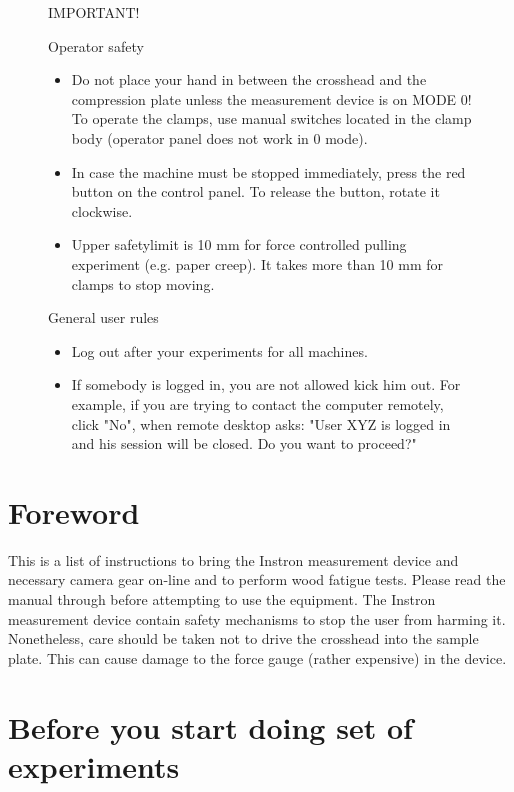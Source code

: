 \documentclass[a4paper]{article}
\begin{document}
\begin{figure}[htb]
  \begin{minipage}[\textwidth]{\textwidth}
    {\color{red}
     {\Large IMPORTANT!}

     {\Large Operator safety}
     \begin{itemize}
       \item Do not place your hand in between the crosshead and the compression plate unless the measurement device is on \textsf{MODE 0}! To operate the clamps, use manual switches located in the clamp body (operator panel does not work in 0 mode).
       \item In case the machine must be stopped immediately, press the red button on the control panel. To release the button, rotate it clockwise.
       \item Upper safetylimit is 10 mm for force controlled pulling experiment (e.g. paper creep). It takes more than 10 mm for clamps to stop moving.
     \end{itemize}

     {\Large General user rules}
     \begin{itemize}
       \item Log out after your experiments for all machines.
       \item If somebody is logged in, you are not allowed kick him out. For example, if you are trying to contact the computer remotely, click "No", when remote desktop asks: "User XYZ is logged in and his session will be closed. Do you want to proceed?"
     \end{itemize}
     }
  \end{minipage}
\end{figure}

\clearpage

\section{Foreword}

This is a list of instructions to bring the Instron measurement device
and necessary camera gear on-line and to perform wood fatigue
tests. Please read the manual through before attempting to use the
equipment. The Instron measurement device contain safety mechanisms to
stop the user from harming it. Nonetheless, care should be taken not
to drive the crosshead into the sample plate. This can cause damage to
the force gauge (rather expensive) in the device.

\section{Before you start doing set of experiments}
\end{document}

